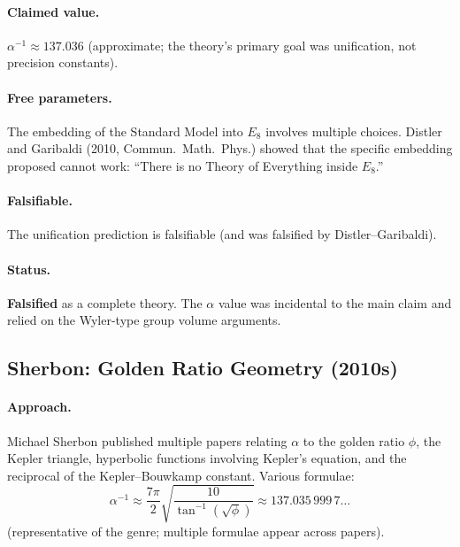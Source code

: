 \documentclass[11pt,a4paper]{article}
\begin{document}
\paragraph{Claimed value.}
$\alpha^{-1}\approx 137.036$ (approximate; the theory's primary goal was unification, not precision constants).

\paragraph{Free parameters.}
The embedding of the Standard Model into $E_8$ involves multiple choices.  Distler and Garibaldi (2010, Commun.\ Math.\ Phys.) showed that the specific embedding proposed cannot work: ``There is no Theory of Everything inside $E_8$.''

\paragraph{Falsifiable.}
The unification prediction is falsifiable (and was falsified by Distler--Garibaldi).

\paragraph{Status.}
\textbf{Falsified} as a complete theory.  The $\alpha$ value was incidental to the main claim and relied on the Wyler-type group volume arguments.

\subsection{Sherbon: Golden Ratio Geometry (2010s)}\label{sec:sherbon}

\paragraph{Approach.}
Michael Sherbon published multiple papers relating $\alpha$ to the golden ratio $\phi$, the Kepler triangle, hyperbolic functions involving Kepler's equation, and the reciprocal of the Kepler--Bouwkamp constant.  Various formulae:
\begin{equation}
\alpha^{-1} \approx \frac{7\pi}{2}\sqrt{\frac{10}{\tan^{-1}(\sqrt{\phi})}} \approx 137.035\,999\,7\ldots
\end{equation}
(representative of the genre; multiple formulae appear across papers).
\end{document}
